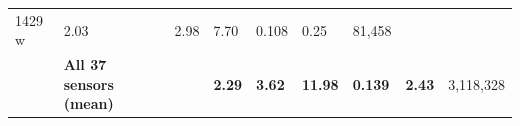 \documentclass[
  10pt, ]{article}
\begin{document}
\begin{longtable}[]{@{}lllllllll@{}}
\begin{minipage}[t]{0.08\columnwidth}
1429 w\strut
\end{minipage} & \begin{minipage}[t]{0.08\columnwidth}\raggedright
2.03\strut
\end{minipage} & \begin{minipage}[t]{0.08\columnwidth}\raggedright
2.98\strut
\end{minipage} & \begin{minipage}[t]{0.08\columnwidth}\raggedright
7.70\strut
\end{minipage} & \begin{minipage}[t]{0.08\columnwidth}\raggedright
0.108\strut
\end{minipage} & \begin{minipage}[t]{0.08\columnwidth}\raggedright
0.25\strut
\end{minipage} & \begin{minipage}[t]{0.08\columnwidth}\raggedright
81,458\strut
\end{minipage}\tabularnewline
\begin{minipage}[t]{0.08\columnwidth}\raggedright
\strut
\end{minipage} & \begin{minipage}[t]{0.08\columnwidth}\raggedright
\textbf{All 37 sensors (mean)}\strut
\end{minipage} & \begin{minipage}[t]{0.08\columnwidth}\raggedright
\strut
\end{minipage} & \begin{minipage}[t]{0.08\columnwidth}\raggedright
\textbf{2.29}\strut
\end{minipage} & \begin{minipage}[t]{0.08\columnwidth}\raggedright
\textbf{3.62}\strut
\end{minipage} & \begin{minipage}[t]{0.08\columnwidth}\raggedright
\textbf{11.98}\strut
\end{minipage} & \begin{minipage}[t]{0.08\columnwidth}\raggedright
\textbf{0.139}\strut
\end{minipage} & \begin{minipage}[t]{0.08\columnwidth}\raggedright
\textbf{2.43}\strut
\end{minipage} & \begin{minipage}[t]{0.08\columnwidth}\raggedright
3,118,328\strut
\end{minipage}\tabularnewline
\bottomrule
\end{longtable}
\end{document}
